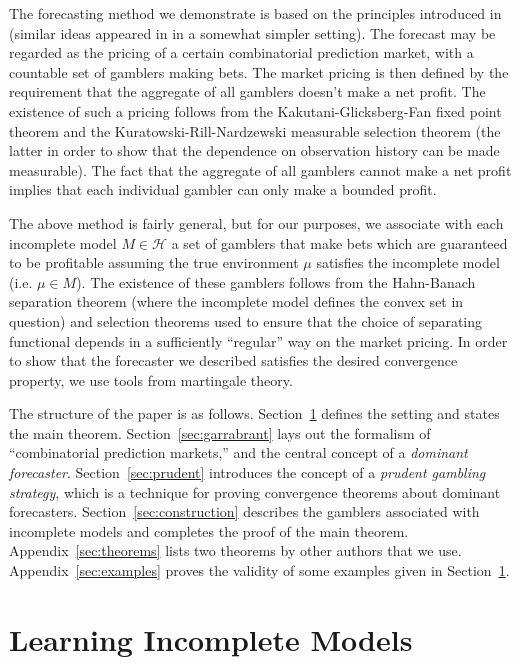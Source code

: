 \documentclass[11pt]{article}
\theoremstyle{definition}
\theoremstyle{plain}
\newcommand{\MC}{\mathcal{H}}
\begin{document}
The forecasting method we demonstrate is based on the principles introduced in \cite{Garrabrant_2016} (similar ideas appeared in \cite{Vovk_2005} in a somewhat simpler setting). The forecast may be regarded as the pricing of a certain combinatorial prediction market, with a countable set of gamblers making bets. The market pricing is then defined by the requirement that the aggregate of all gamblers doesn't make a net profit. The existence of such a pricing follows from the Kakutani-Glicksberg-Fan fixed point theorem and the Kuratowski-Rill-Nardzewski measurable selection theorem (the latter in order to show that the dependence on observation history can be made measurable). The fact that the aggregate of all gamblers cannot make a net profit implies that each individual gambler can only make a bounded profit.

The above method is fairly general, but for our purposes, we associate with each incomplete model $M \in \MC$ a set of gamblers that make bets which are guaranteed to be profitable assuming the true environment $\mu$ satisfies the incomplete model (i.e. $\mu \in M$). The existence of these gamblers follows from the Hahn-Banach separation theorem (where the incomplete model defines the convex set in question) and selection theorems used to ensure that the choice of separating functional depends in a sufficiently \enquote{regular} way on the market pricing. In order to show that the forecaster we described satisfies the desired convergence property, we use tools from martingale theory.

The structure of the paper is as follows. Section~\ref{sec:learning} defines the setting and states the main theorem. Section~\ref{sec:garrabrant} lays out the formalism of \enquote{combinatorial prediction markets,} and the central concept of a \emph{dominant forecaster}. Section~\ref{sec:prudent} introduces the concept of a \emph{prudent gambling strategy}, which is a technique for proving convergence theorems about dominant forecasters. Section~\ref{sec:construction} describes the gamblers associated with incomplete models and completes the proof of the main theorem. Appendix~\ref{sec:theorems} lists two theorems by other authors that we use. Appendix~\ref{sec:examples} proves the validity of some examples given in Section~\ref{sec:learning}.

\section{Learning Incomplete Models}
\label{sec:learning}
\end{document}
